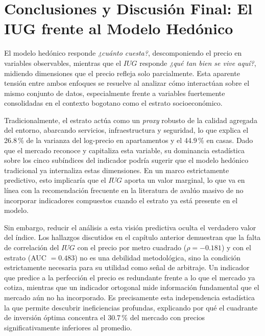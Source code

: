 \documentclass[12pt, a4paper, twoside, openright]{report}
\theoremstyle{plain}
\theoremstyle{definition}
\newcommand{\IUG}{IUG}             %
\begin{document}

\chapter{Conclusiones y Discusión Final: El IUG frente al Modelo Hedónico}\label{ch:comparacion}

El modelo hedónico responde \emph{¿cuánto cuesta?}, descomponiendo el precio en variables observables, mientras que el $\IUG$ responde \emph{¿qué tan bien se vive aquí?}, midiendo dimensiones que el precio refleja solo parcialmente. Esta aparente tensión entre ambos enfoques se resuelve al analizar cómo interactúan sobre el mismo conjunto de datos, especialmente frente a variables fuertemente consolidadas en el contexto bogotano como el estrato socioeconómico.

Tradicionalmente, el estrato actúa como un \emph{proxy} robusto de la calidad agregada del entorno, abarcando servicios, infraestructura y seguridad, lo que explica el 26.8\,\% de la varianza del log-precio en apartamentos y el 44.9\,\% en casas. Dado que el mercado reconoce y capitaliza esta variable, su dominancia estadística sobre los cinco subíndices del indicador podría sugerir que el modelo hedónico tradicional ya internaliza estas dimensiones. En un marco estrictamente predictivo, esto implicaría que el $\IUG$ aporta un valor marginal, lo que va en línea con la recomendación frecuente en la literatura de avalúo masivo de no incorporar indicadores compuestos cuando el estrato ya está presente en el modelo.

Sin embargo, reducir el análisis a esta visión predictiva oculta el verdadero valor del índice. Los hallazgos discutidos en el capítulo anterior demuestran que la falta de correlación del $\IUG$ con el precio por metro cuadrado ($\rho = -0.181$) y con el estrato (AUC $= 0.483$) no es una debilidad metodológica, sino la condición estrictamente necesaria para su utilidad como señal de arbitraje. Un indicador que predice a la perfección el precio es redundante frente a lo que el mercado ya cotiza, mientras que un indicador ortogonal mide información fundamental que el mercado aún no ha incorporado. Es precisamente esta independencia estadística la que permite descubrir ineficiencias profundas, explicando por qué el cuadrante de inversión óptima concentra el 30.7\,\% del mercado con precios significativamente inferiores al promedio.
\end{document}
